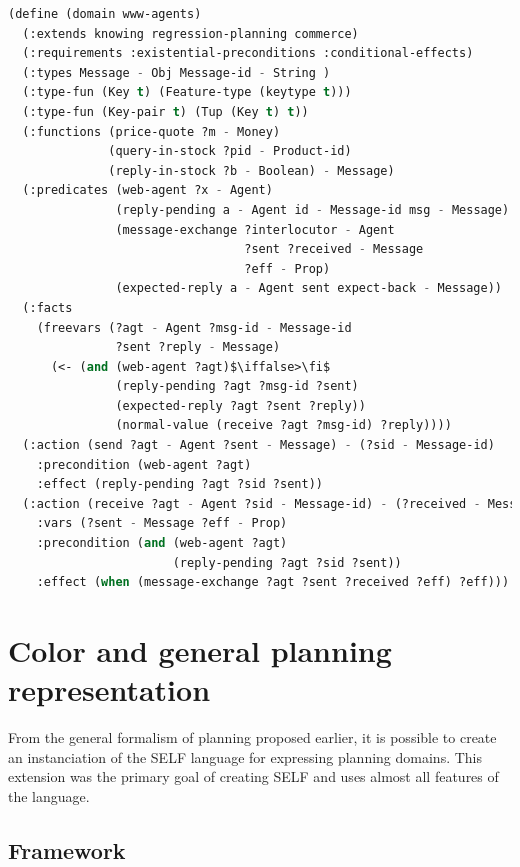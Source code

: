 \documentclass[11pt,a4paper,twoside,openright,titlepage,numbers=noenddot,headinclude,cleardoublepage=empty,openany]{scrreprt}
\theoremstyle{plain}
\theoremstyle{definition}
\theoremstyle{remark}
\begin{document}
\begin{lstlisting}[language=Lisp, caption={Example of the updated OPT syntax as described by Mc Dermott.}, escapechar={$}, label=lst:opt]
(define (domain www-agents)
  (:extends knowing regression-planning commerce)
  (:requirements :existential-preconditions :conditional-effects)
  (:types Message - Obj Message-id - String )
  (:type-fun (Key t) (Feature-type (keytype t)))
  (:type-fun (Key-pair t) (Tup (Key t) t))
  (:functions (price-quote ?m - Money)
              (query-in-stock ?pid - Product-id)
              (reply-in-stock ?b - Boolean) - Message)
  (:predicates (web-agent ?x - Agent)
               (reply-pending a - Agent id - Message-id msg - Message)
               (message-exchange ?interlocutor - Agent
                                 ?sent ?received - Message
                                 ?eff - Prop)
               (expected-reply a - Agent sent expect-back - Message))
  (:facts
    (freevars (?agt - Agent ?msg-id - Message-id
               ?sent ?reply - Message)
      (<- (and (web-agent ?agt)$\iffalse>\fi$
               (reply-pending ?agt ?msg-id ?sent)
               (expected-reply ?agt ?sent ?reply))
               (normal-value (receive ?agt ?msg-id) ?reply))))
  (:action (send ?agt - Agent ?sent - Message) - (?sid - Message-id)
    :precondition (web-agent ?agt)
    :effect (reply-pending ?agt ?sid ?sent))
  (:action (receive ?agt - Agent ?sid - Message-id) - (?received - Message)
    :vars (?sent - Message ?eff - Prop)
    :precondition (and (web-agent ?agt)
                       (reply-pending ?agt ?sid ?sent))
    :effect (when (message-exchange ?agt ?sent ?received ?eff) ?eff)))
\end{lstlisting}

\hypertarget{color-and-general-planning-representation}{%
\section{Color and general planning
representation}\label{color-and-general-planning-representation}}

From the general formalism of planning proposed earlier, it is possible
to create an instanciation of the SELF language for expressing planning
domains. This extension was the primary goal of creating SELF and uses
almost all features of the language.

\hypertarget{framework}{%
\subsection{Framework}\label{framework}}
\end{document}
